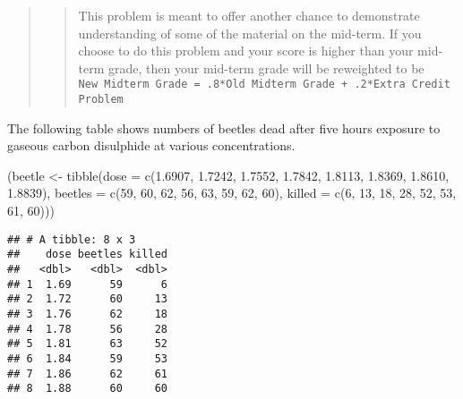 \documentclass[
]{article}
\newenvironment{Shaded}{\begin{snugshade}}{\end{snugshade}}
\newcommand{\AttributeTok}[1]{\textcolor[rgb]{0.77,0.63,0.00}{#1}}
\newcommand{\DecValTok}[1]{\textcolor[rgb]{0.00,0.00,0.81}{#1}}
\newcommand{\FloatTok}[1]{\textcolor[rgb]{0.00,0.00,0.81}{#1}}
\newcommand{\FunctionTok}[1]{\textcolor[rgb]{0.00,0.00,0.00}{#1}}
\newcommand{\NormalTok}[1]{#1}
\newcommand{\OtherTok}[1]{\textcolor[rgb]{0.56,0.35,0.01}{#1}}
\begin{document}
\begin{quote}
\begin{quote}
This problem is meant to offer another chance to demonstrate
understanding of some of the material on the mid-term. If you choose to
do this problem and your score is higher than your mid-term grade, then
your mid-term grade will be reweighted to be
\texttt{New\ Midterm\ Grade\ =\ .8*Old\ Midterm\ Grade\ +\ .2*Extra\ Credit\ Problem}
\end{quote}
\end{quote}

The following table shows numbers of beetles dead after five hours
exposure to gaseous carbon disulphide at various concentrations.

\begin{Shaded}
\begin{Highlighting}[]
\NormalTok{(beetle }\OtherTok{\textless{}{-}} \FunctionTok{tibble}\NormalTok{(}\AttributeTok{dose =} \FunctionTok{c}\NormalTok{(}\FloatTok{1.6907}\NormalTok{, }\FloatTok{1.7242}\NormalTok{, }\FloatTok{1.7552}\NormalTok{, }\FloatTok{1.7842}\NormalTok{, }\FloatTok{1.8113}\NormalTok{, }\FloatTok{1.8369}\NormalTok{, }\FloatTok{1.8610}\NormalTok{, }\FloatTok{1.8839}\NormalTok{),}
                 \AttributeTok{beetles =} \FunctionTok{c}\NormalTok{(}\DecValTok{59}\NormalTok{, }\DecValTok{60}\NormalTok{, }\DecValTok{62}\NormalTok{, }\DecValTok{56}\NormalTok{, }\DecValTok{63}\NormalTok{, }\DecValTok{59}\NormalTok{, }\DecValTok{62}\NormalTok{, }\DecValTok{60}\NormalTok{),}
                 \AttributeTok{killed =} \FunctionTok{c}\NormalTok{(}\DecValTok{6}\NormalTok{, }\DecValTok{13}\NormalTok{, }\DecValTok{18}\NormalTok{, }\DecValTok{28}\NormalTok{, }\DecValTok{52}\NormalTok{, }\DecValTok{53}\NormalTok{, }\DecValTok{61}\NormalTok{, }\DecValTok{60}\NormalTok{)))}
\end{Highlighting}
\end{Shaded}

\begin{verbatim}
## # A tibble: 8 x 3
##    dose beetles killed
##   <dbl>   <dbl>  <dbl>
## 1  1.69      59      6
## 2  1.72      60     13
## 3  1.76      62     18
## 4  1.78      56     28
## 5  1.81      63     52
## 6  1.84      59     53
## 7  1.86      62     61
## 8  1.88      60     60
\end{verbatim}
\end{document}
